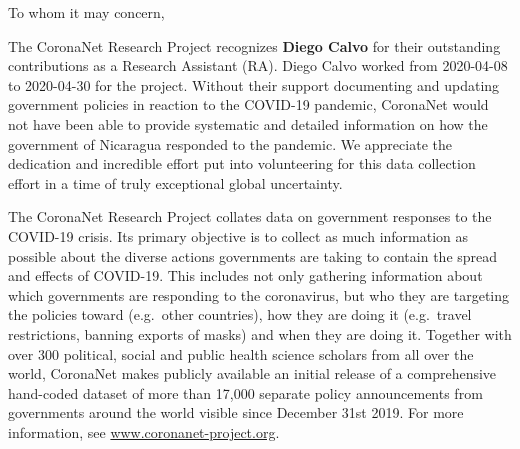 \documentclass[
]{article}
\title{\vspace{-3cm}
\fontfamily{cmr}\fontsize{20}{100}\selectfont {\color{cngray} \textbf{Certificate of Appreciation}}}
\author{}
\date{\vspace{-2.5em}}
\begin{document}
\maketitle

\addtolength{\headheight}{2.0cm}
\pagestyle{fancyplain}
\fancyhf{}
\renewcommand{\headrulewidth}{0pt}

\fontsize{12}{4}\selectfont
\setlength{\baselineskip}{0.5cm}

\color{cntext}

To whom it may concern,

The CoronaNet Research Project recognizes \textbf{Diego Calvo} for their
outstanding contributions as a Research Assistant (RA). Diego Calvo
worked from 2020-04-08 to 2020-04-30 for the project. Without their
support documenting and updating government policies in reaction to the
COVID-19 pandemic, CoronaNet would not have been able to provide
systematic and detailed information on how the government of Nicaragua
responded to the pandemic. We appreciate the dedication and incredible
effort put into volunteering for this data collection effort in a time
of truly exceptional global uncertainty.

The CoronaNet Research Project collates data on government responses to
the COVID-19 crisis. Its primary objective is to collect as much
information as possible about the diverse actions governments are taking
to contain the spread and effects of COVID-19. This includes not only
gathering information about which governments are responding to the
coronavirus, but who they are targeting the policies toward (e.g.~other
countries), how they are doing it (e.g.~travel restrictions, banning
exports of masks) and when they are doing it. Together with over 300
political, social and public health science scholars from all over the
world, CoronaNet makes publicly available an initial release of a
comprehensive hand-coded dataset of more than 17,000 separate policy
announcements from governments around the world visible since December
31st 2019. For more information, see \url{www.coronanet-project.org}.
\end{document}
